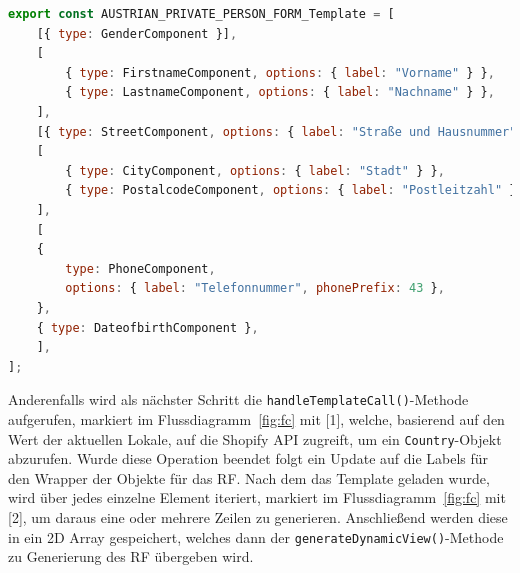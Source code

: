 \begin{lstlisting}[caption={Vordefiniertes Template für das RF},captionpos=b, language=JavaScript,label={lst:template_form_aut}]
export const AUSTRIAN_PRIVATE_PERSON_FORM_Template = [
	[{ type: GenderComponent }],
	[
		{ type: FirstnameComponent, options: { label: "Vorname" } },
		{ type: LastnameComponent, options: { label: "Nachname" } },
	],
	[{ type: StreetComponent, options: { label: "Straße und Hausnummer" } }],
	[
		{ type: CityComponent, options: { label: "Stadt" } },
		{ type: PostalcodeComponent, options: { label: "Postleitzahl" } },
	],
	[
	{
		type: PhoneComponent,
		options: { label: "Telefonnummer", phonePrefix: 43 },
	},
	{ type: DateofbirthComponent },
	],
];
\end{lstlisting}

Anderenfalls wird als nächster Schritt die \texttt{handleTemplateCall()}-Methode aufgerufen, markiert im Flussdiagramm~\ref{fig:fc} mit [1], welche, basierend auf den Wert der aktuellen Lokale, auf die Shopify API zugreift, um ein \texttt{Country}-Objekt abzurufen. Wurde diese Operation beendet folgt ein Update auf die Labels für den Wrapper der Objekte für das RF. Nach dem das Template geladen wurde, wird über jedes einzelne Element iteriert, markiert im Flussdiagramm~\ref{fig:fc} mit [2], um daraus eine oder mehrere Zeilen zu generieren. Anschließend werden diese in ein 2D Array gespeichert, welches dann der \texttt{generateDynamicView()}-Methode zu Generierung des RF übergeben wird. 


